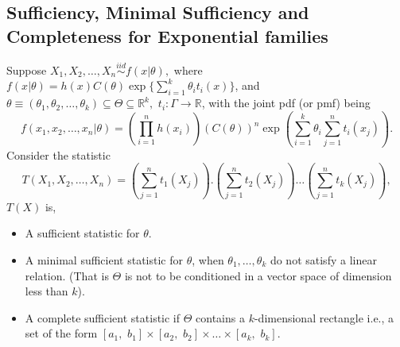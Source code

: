 \documentclass[a4paper,english,12pt]{article}
\begin{document}
\subsection{Sufficiency, Minimal Sufficiency and Completeness for Exponential families}
\begin{thm}
Suppose $X_1,X_2,\dots,X_n \overset{iid}{\sim} f(x|\theta),$ where $f(x|\theta)=h(x)C(\theta)\exp\{\sum \limits_{i=1}^k\theta_i t_i(x)\}$, and $\theta\equiv(\theta_1,\theta_2,\dots,\theta_k)\subseteq\Theta\subseteq\mathbb{R}^k, \,\, t_i:\Gamma\rightarrow\mathbb{R}$,
with the joint pdf (or pmf) being 
\begin{equation*}
f(x_1,x_2,\dots,x_n|\theta)=\left(\prod\limits_{i=1}^n h(x_i)\right) \left(C(\theta)\right)^n \exp\left(\sum\limits_{i=1}^k \theta_i \sum\limits_{j=1}^n t_i(x_j) \right).
\end{equation*}
Consider the statistic 
\begin{equation*}
T(X_1,X_2,\dots,X_n)= \left(\sum_{j=1}^n t_1(X_j)\right).\left(\sum_{j=1}^n t_2(X_j)\right)\dots \left(\sum_{j=1}^n t_k(X_j)\right),
\end{equation*}
$T(X)$ is,
\begin{itemize}
\item A sufficient statistic for  $\theta$.
\item A minimal sufficient statistic for $\theta$, when $\theta_1,\dots,\theta_k$ do not satisfy a linear relation. (That is $\Theta$ is not to be conditioned in a vector space of dimension less than $k$).
\item A complete sufficient statistic if $\Theta$ contains a $k$-dimensional rectangle i.e., a set of the form $[a_1,\,\, b_1]\times[a_2, \,\, b_2]\times\dots\times[a_k, \,\, b_k]$.
\end{itemize}
\end{thm}
\end{document}
